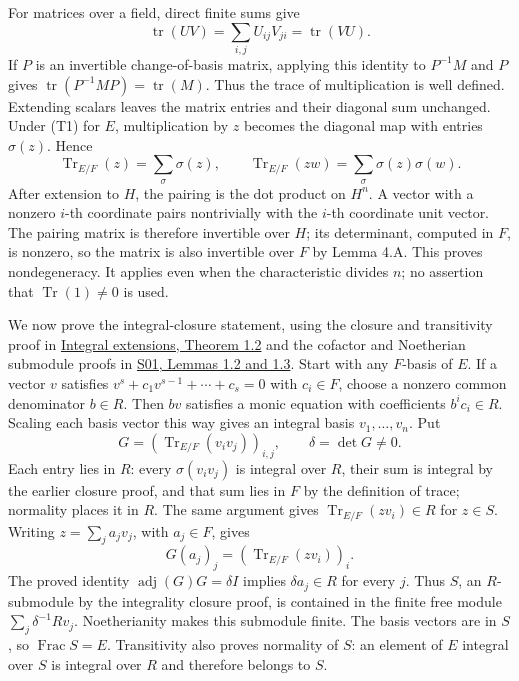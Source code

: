 \documentclass[11pt,a4paper,openany]{report}
\begin{document}
For matrices over a field, direct finite sums give \[
\operatorname{tr}(UV)=\sum_{i,j}U_{ij}V_{ji}
                   =\operatorname{tr}(VU).
\] If \(P\) is an invertible change-of-basis matrix, applying this identity to \(P^{-1}M\) and \(P\) gives \(\operatorname{tr}(P^{-1}MP)=\operatorname{tr}(M)\). Thus the trace of multiplication is well defined. Extending scalars leaves the matrix entries and their diagonal sum unchanged. Under (T1) for \(E\), multiplication by \(z\) becomes the diagonal map with entries \(\sigma(z)\). Hence \[
\operatorname{Tr}_{E/F}(z)=\sum_\sigma\sigma(z),
\qquad
\operatorname{Tr}_{E/F}(zw)=\sum_\sigma\sigma(z)\sigma(w). \tag{T3}
\] After extension to \(H\), the pairing is the dot product on \(H^n\). A vector with a nonzero \(i\)-th coordinate pairs nontrivially with the \(i\)-th coordinate unit vector. The pairing matrix is therefore invertible over \(H\); its determinant, computed in \(F\), is nonzero, so the matrix is also invertible over \(F\) by Lemma 4.A. This proves nondegeneracy. It applies even when the characteristic divides \(n\); no assertion that \(\operatorname{Tr}(1)\ne0\) is used.

We now prove the integral-closure statement, using the closure and transitivity proof in \href{https://github.com/KokunoYumeto/open-math-courses/blob/d02d0a3669f42579db037cd44de1d113fdd770a1/docs/courses/AG-CA/src/integral-extensions-lying-over-going-up-and-going-down.md}{Integral extensions, Theorem 1.2} and the cofactor and Noetherian submodule proofs in \href{https://github.com/KokunoYumeto/open-math-courses/blob/main/docs/courses/AG-RG/AG-RG-S01.md}{S01, Lemmas 1.2 and 1.3}. Start with any \(F\)-basis of \(E\). If a vector \(v\) satisfies \(v^s+c_1v^{s-1}+\cdots+c_s=0\) with \(c_i\in F\), choose a nonzero common denominator \(b\in R\). Then \(bv\) satisfies a monic equation with coefficients \(b^ic_i\in R\). Scaling each basis vector this way gives an integral basis \(v_1,\ldots,v_n\). Put \[
G=(\operatorname{Tr}_{E/F}(v_iv_j))_{i,j},
\qquad \delta=\det G\ne0.
\] Each entry lies in \(R\): every \(\sigma(v_iv_j)\) is integral over \(R\), their sum is integral by the earlier closure proof, and that sum lies in \(F\) by the definition of trace; normality places it in \(R\). The same argument gives \(\operatorname{Tr}_{E/F}(zv_i)\in R\) for \(z\in S\). Writing \(z=\sum_j a_jv_j\), with \(a_j\in F\), gives \[
G(a_j)_j=(\operatorname{Tr}_{E/F}(zv_i))_i.
\] The proved identity \(\operatorname{adj}(G)G=\delta I\) implies \(\delta a_j\in R\) for every \(j\). Thus \(S\), an \(R\)-submodule by the integrality closure proof, is contained in the finite free module \(\sum_j\delta^{-1}Rv_j\). Noetherianity makes this submodule finite. The basis vectors are in \(S\), so \(\operatorname{Frac}S=E\). Transitivity also proves normality of \(S\): an element of \(E\) integral over \(S\) is integral over \(R\) and therefore belongs to \(S\).
\end{document}
